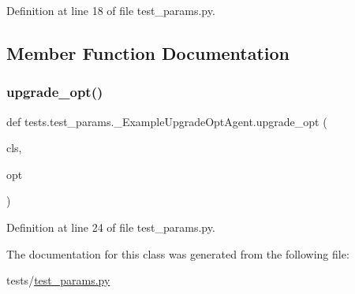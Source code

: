 Definition at line 18 of file test\+\_\+params.\+py.



\subsection{Member Function Documentation}
\mbox{\label{classtests_1_1test__params_1_1__ExampleUpgradeOptAgent_ad842b65ef0ce493c7644622aae6e17dc}} 
\subsubsection{\texorpdfstring{upgrade\+\_\+opt()}{upgrade\_opt()}}
{\footnotesize\ttfamily def tests.\+test\+\_\+params.\+\_\+\+Example\+Upgrade\+Opt\+Agent.\+upgrade\+\_\+opt (\begin{DoxyParamCaption}\item[{}]{cls,  }\item[{}]{opt }\end{DoxyParamCaption})}



Definition at line 24 of file test\+\_\+params.\+py.



The documentation for this class was generated from the following file\+:\begin{DoxyCompactItemize}
\item 
tests/\hyperlink{test__params_8py}{test\+\_\+params.\+py}\end{DoxyCompactItemize}
